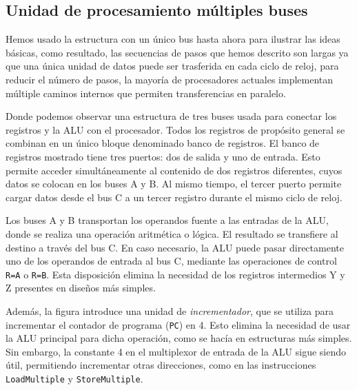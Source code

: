 \subsection{Unidad de procesamiento múltiples buses}
Hemos usado la estructura con un único bus hasta ahora para ilustrar las ideas básicas, como resultado, las secuencias
de pasos que hemos descrito son largas ya que una única unidad de datos puede ser trasferida en cada ciclo de reloj, para 
reducir el número de pasos, la mayoría de procesadores actuales implementan múltiple caminos internos que permiten 
transferencias en paralelo.
\begin{center}
    
\end{center}
Donde podemos observar una estructura de tres buses usada para conectar los registros y la ALU con el procesador. 
Todos los registros de propósito general se combinan en un único bloque denominado banco de registros.
El banco de registros mostrado tiene tres puertos: dos de salida y uno de entrada. Esto permite acceder simultáneamente al contenido 
de dos registros diferentes, cuyos datos se colocan en los buses A y B. Al mismo tiempo, el tercer puerto permite cargar datos desde el 
bus C a un tercer registro durante el mismo ciclo de reloj. 

Los buses A y B transportan los operandos fuente a las entradas de la ALU, donde se realiza una operación aritmética o lógica. El 
resultado se transfiere al destino a través del bus C. En caso necesario, la ALU puede pasar directamente uno de los operandos de 
entrada al bus C, mediante las operaciones de control \texttt{R=A} o \texttt{R=B}. Esta disposición elimina la necesidad de los 
registros intermedios Y y Z presentes en diseños más simples.

Además, la figura introduce una unidad de \textit{incrementador}, que se utiliza para incrementar el contador de programa (\texttt{PC}) 
en 4. Esto elimina la necesidad de usar la ALU principal para dicha operación, como se hacía en estructuras más simples. Sin embargo, 
la constante 4 en el multiplexor de entrada de la ALU sigue siendo útil, permitiendo incrementar otras direcciones, como en las 
instrucciones \texttt{LoadMultiple} y \texttt{StoreMultiple}.

